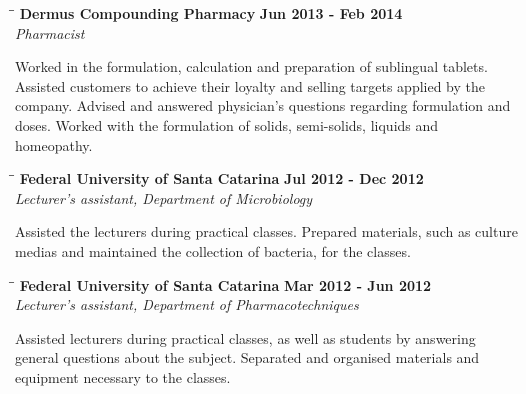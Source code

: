 \documentclass[margin]{res}
\begin{document}
\begin{resume}
\vspace{-0.1in}
   \begin{tabbing}
   \hspace{2.3in}\= \hspace{1.7in}\= \kill %
    \textbf{Dermus Compounding Pharmacy}    \>\>\textbf{Jun 2013 - Feb 2014}\\
    \textit{Pharmacist}\\        
   \end{tabbing}\vspace{-20pt}      %
Worked in the formulation, calculation and preparation of sublingual tablets. Assisted customers to achieve their
loyalty and selling targets applied by the company. Advised and answered physician’s questions regarding formulation
and doses. Worked with the formulation of solids, semi-solids, liquids and homeopathy.

\vspace{-0.1in}
   \begin{tabbing}
   \hspace{2.3in}\= \hspace{1.7in}\= \kill %
    \textbf{Federal University of Santa Catarina}    \>\>\textbf{Jul 2012 - Dec 2012}\\
    \textit{Lecturer’s assistant, Department of Microbiology}\\        
   \end{tabbing}\vspace{-20pt}      %
Assisted the lecturers during practical classes. Prepared materials, such as culture medias and maintained the
collection of bacteria, for the classes.

\vspace{-0.1in}
   \begin{tabbing}
   \hspace{2.3in}\= \hspace{1.7in}\= \kill %
    \textbf{Federal University of Santa Catarina}    \>\>\textbf{Mar 2012 - Jun 2012}\\
    \textit{Lecturer’s assistant, Department of Pharmacotechniques}\\        
   \end{tabbing}\vspace{-20pt}      %
Assisted lecturers during practical classes, as well as students by answering general questions about the subject.
Separated and organised materials and equipment necessary to the classes.


\end{resume}
\end{document}
